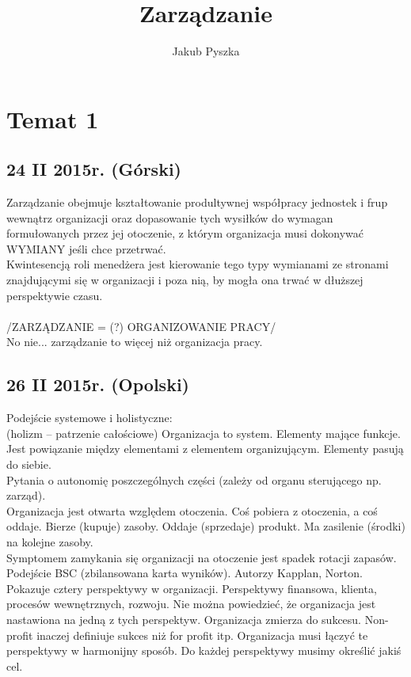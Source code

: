\documentclass[a4paper,10pt]{report}
\title{Zarządzanie}
\author{Jakub Pyszka}
\begin{document}
\maketitle
\tableofcontents{}

\chapter{Temat 1}

\section{24 II 2015r. (Górski)}

Zarządzanie obejmuje kształtowanie produltywnej współpracy jednostek i frup wewnątrz organizacji oraz dopasowanie tych wysiłków do wymagan formułowanych przez jej otoczenie, z którym organizacja musi dokonywać WYMIANY jeśli chce przetrwać. \\
\indent Kwintesencją roli menedżera jest kierowanie tego typy wymianami ze stronami znajdującymi się w organizacji i poza nią, by mogła ona trwać w dłuższej perspektywie czasu.\\ \\

/ZARZĄDZANIE = (?) ORGANIZOWANIE PRACY/ \\
No nie... zarządzanie to więcej niż organizacja pracy. 



\section{26 II 2015r. (Opolski)}
Podejście systemowe i holistyczne: \\
(holizm -- patrzenie całościowe)
Organizacja to system. Elementy mające funkcje. Jest powiązanie między elementami z elementem organizującym. Elementy pasują do siebie.\\ 
Pytania o autonomię poszczególnych części (zależy od organu sterującego np. zarząd). \\
Organizacja jest otwarta względem otoczenia. Coś pobiera z otoczenia, a coś oddaje. Bierze (kupuje) zasoby. Oddaje (sprzedaje) produkt. Ma zasilenie (środki) na kolejne zasoby. \\
Symptomem zamykania się organizacji na otoczenie jest spadek rotacji zapasów. \\
Podejście BSC (zbilansowana karta wyników). Autorzy Kapplan, Norton. Pokazuje cztery perspektywy w organizacji. Perspektywy finansowa, klienta, procesów wewnętrznych, rozwoju. Nie można powiedzieć, że organizacja jest nastawiona na jedną z tych perspektyw. Organizacja zmierza do sukcesu. Non-profit inaczej definiuje sukces niż for profit itp. Organizacja musi łączyć te perspektywy w harmonijny sposób. Do każdej perspektywy musimy określić jakiś cel. \\
\end{document}
